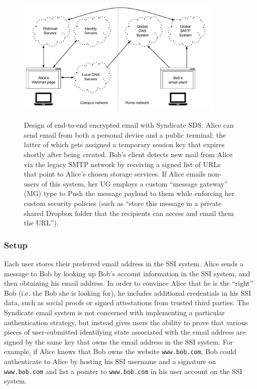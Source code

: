 \begin{figure}[h]
   \caption{Design of end-to-end encrypted email with Syndicate SDS.  Alice can
   send email from both a personal device and a public terminal; the latter of
   which gets assigned a temporary session key that expires shortly after being
   created.  Bob's client detects new mail from Alice via the legacy SMTP
   network by receiving a signed list of URLs that point to Alice's chosen
   storage services.  If Alice emails non-users of this system, her UG employs a
   custom ``message gateway'' (MG) type to Push the message payload to them
   while enforcing her custom security policies (such as ``store this message in
   a private shared Dropbox folder that the recipients can access and email them
   the URL'').}
   \centering
   \includegraphics[width=0.9\textwidth,page=24]{figures/dissertation-figures}
   \label{fig:chap4-syndicate-mail}
\end{figure}

\subsubsection{Setup}

Each user stores their preferred email address in the SSI system.
Alice sends a message to Bob by looking up Bob's account
information in the SSI system, and then obtaining his email address.  In order
to convince Alice that he is the ``right'' Bob (i.e. the Bob she is looking
for), he includes additional credentials in his SSI data, such as social proofs
or signed attestations from trusted third parties.  The Syndicate email system
is not concerned with implementing a particular authentication strategy, but instead gives users
the ability to prove that various pieces of user-submitted identifying state associated with
the email address are signed by the same key that owns the email address
in the SSI system.  For example, if Alice knows that Bob owns the website
\texttt{www.bob.com}, Bob could authenticate to Alice by hosting his SSI
username and a signature on
\texttt{www.bob.com} and list a pointer to \texttt{www.bob.com} in his user
account on the SSI system.

